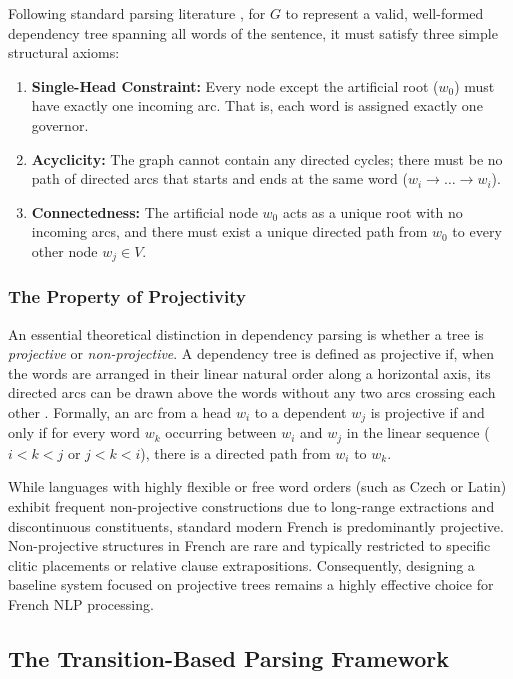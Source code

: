 \documentclass[12pt,a4paper]{article}
\begin{document}
Following standard parsing literature \cite{jurafsky2026speech}, for $G$ to represent a valid, well-formed dependency tree spanning all words of the sentence, it must satisfy three simple structural axioms:
\begin{enumerate}
    \item \textbf{Single-Head Constraint:} Every node except the artificial root ($w_0$) must have exactly one incoming arc. That is, each word is assigned exactly one governor.
    \item \textbf{Acyclicity:} The graph cannot contain any directed cycles; there must be no path of directed arcs that starts and ends at the same word ($w_i \rightarrow \dots \rightarrow w_i$).
    \item \textbf{Connectedness:} The artificial node $w_0$ acts as a unique root with no incoming arcs, and there must exist a unique directed path from $w_0$ to every other node $w_j \in V$.
\end{enumerate}

\subsubsection{The Property of Projectivity}

An essential theoretical distinction in dependency parsing is whether a tree is \textit{projective} or \textit{non-projective}. 
A dependency tree is defined as projective if, when the words are arranged in their linear natural order along a horizontal axis, its directed arcs can be drawn above the words without any two arcs crossing each other \cite{nivre2003efficient}. Formally, an arc from a head $w_i$ to a dependent $w_j$ is projective if and only if for every word $w_k$ occurring between $w_i$ and $w_j$ in the linear sequence ($i < k < j$ or $j < k < i$), there is a directed path from $w_i$ to $w_k$.

% 

While languages with highly flexible or free word orders (such as Czech or Latin) exhibit frequent non-projective constructions due to long-range extractions and discontinuous constituents, standard modern French is predominantly projective. Non-projective structures in French are rare and typically restricted to specific clitic placements or relative clause extrapositions. Consequently, designing a baseline system focused on projective trees remains a highly effective choice for French NLP processing.

\subsection{The Transition-Based Parsing Framework}
\label{subsec:transition_based_framework}
\end{document}
